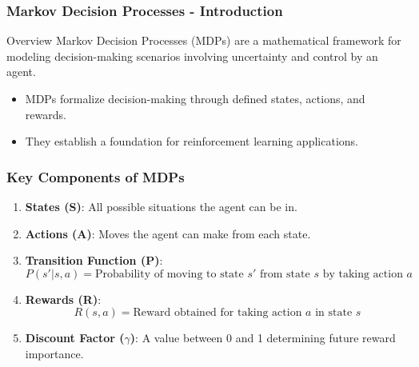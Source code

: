 \documentclass[aspectratio=169]{beamer}
\begin{document}
\begin{frame}[fragile]
    \frametitle{Markov Decision Processes - Introduction}
    \begin{block}{Overview}
        Markov Decision Processes (MDPs) are a mathematical framework for modeling decision-making scenarios involving uncertainty and control by an agent.
    \end{block}
    
    \begin{itemize}
        \item MDPs formalize decision-making through defined states, actions, and rewards.
        \item They establish a foundation for reinforcement learning applications.
    \end{itemize}
\end{frame}

\begin{frame}[fragile]
    \frametitle{Key Components of MDPs}
    \begin{enumerate}
        \item \textbf{States (S)}: All possible situations the agent can be in.
        \item \textbf{Actions (A)}: Moves the agent can make from each state.
        \item \textbf{Transition Function (P)}: 
            \begin{equation}
                P(s' | s, a) = \text{Probability of moving to state } s' \text{ from state } s \text{ by taking action } a
            \end{equation}
        \item \textbf{Rewards (R)}:
            \begin{equation}
                R(s, a) = \text{Reward obtained for taking action } a \text{ in state } s
            \end{equation}
        \item \textbf{Discount Factor ($\gamma$)}: 
        A value between 0 and 1 determining future reward importance.
    \end{enumerate}
\end{frame}
\end{document}
